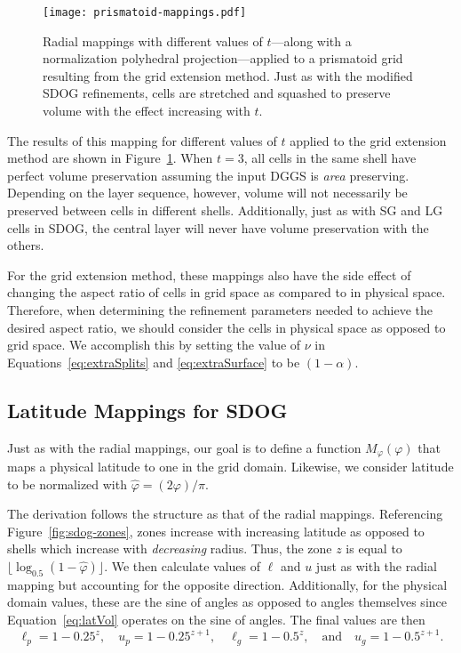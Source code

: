 \begin{figure}[ht!]
	\centering
	\texttt{[image: prismatoid-mappings.pdf]}
	\caption[Radial mappings applied to the grid extension method]{
		Radial mappings with different values of $t$---along with a normalization polyhedral projection---applied to a prismatoid grid resulting from the grid extension method.
		Just as with the modified SDOG refinements, cells are stretched and squashed to preserve volume with the effect increasing with $t$.
	}
	\label{fig:prismatoid-mappings}
\end{figure}


The results of this mapping for different values of $t$ applied to the grid extension method are shown in Figure~\ref{fig:prismatoid-mappings}.
When $t=3$, all cells in the same shell have perfect volume preservation assuming the input DGGS is \textit{area} preserving.
Depending on the layer sequence, however, volume will not necessarily be preserved between cells in different shells.
Additionally, just as with SG and LG cells in SDOG, the central layer will never have volume preservation with the others.


For the grid extension method, these mappings also have the side effect of changing the aspect ratio of cells in grid space as compared to in physical space.
Therefore, when determining the refinement parameters needed to achieve the desired aspect ratio, we should consider the cells in physical space as opposed to grid space.
We accomplish this by setting the value of $\nu$ in Equations~\ref{eq:extraSplits} and \ref{eq:extraSurface} to be $(1 - \alpha)$.


\subsection{Latitude Mappings for SDOG} \label{chap:6:latitude}
Just as with the radial mappings, our goal is to define a function $M_\varphi(\varphi)$ that maps a physical latitude to one in the grid domain. Likewise, we consider latitude to be normalized with $\hat{\varphi} = (2\varphi) / \pi$.


The derivation follows the structure as that of the radial mappings.
Referencing Figure~\ref{fig:sdog-zones}, zones increase with increasing latitude as opposed to shells which increase with \textit{decreasing} radius.
Thus, the zone $z$ is equal to $\lfloor \log_{0.5} ( 1 - \hat{\varphi} ) \rfloor$.
We then calculate values of $\ell$ and $u$ just as with the radial mapping but accounting for the opposite direction.
Additionally, for the physical domain values, these are the sine of angles as opposed to angles themselves since Equation~\ref{eq:latVol} operates on the sine of angles.
The final values are then
%
\begin{equation*}
\ell_p = 1 - 0.25^{z}, \quad u_p = 1 - 0.25^{z + 1}, \quad \ell_g = 1 - 0.5^z, \quad \text{and} \quad u_g = 1 - 0.5^{z + 1}.
\end{equation*}
%

